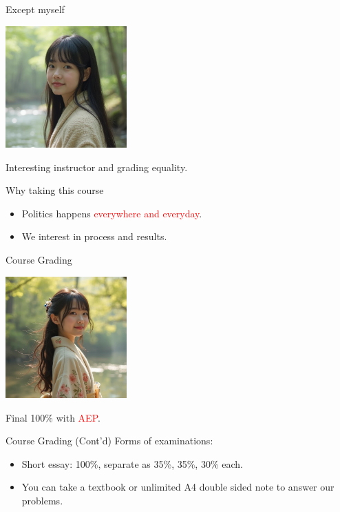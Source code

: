 \documentclass{beamer}
\begin{document}
\begin{frame}{Except myself}
\begin{center}
\includegraphics[width=0.35\textwidth]{tchsiao.png}
\end{center}
\begin{center}
Interesting instructor and grading equality.
\end{center}
\end{frame}
\begin{frame}{Why taking this course}
\begin{itemize}
\item Politics happens \textcolor{red}{everywhere and everyday}.
\item We interest in process and results.
\end{itemize}
\end{frame}
\begin{frame}{Course Grading}
\begin{center}
\includegraphics[width=0.35\textwidth]{examination.png}
\end{center}
\begin{center}
Final 100\% with \textcolor{red}{AEP}.
\end{center}
\end{frame}
\begin{frame}{Course Grading (Cont'd)}
Forms of examinations:
\begin{itemize}
\item Short essay: 100\%, separate as 35\%, 35\%, 30\% each.
\item You can take a textbook or unlimited A4 double sided note to answer our problems.
\end{itemize}
\end{frame}
\end{document}
